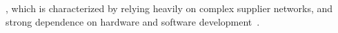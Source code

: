 , which is characterized by relying heavily on complex supplier networks, 
and strong dependence on hardware and software development~\cite{knauss2014towards}.

